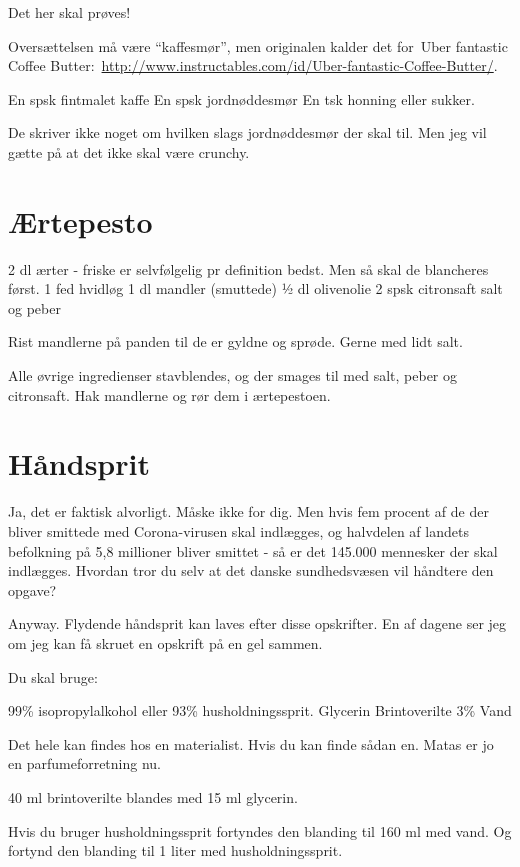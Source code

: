 \documentclass[
]{book}
\begin{document}
Det her skal prøves!~

Oversættelsen må være ``kaffesmør'', men originalen kalder det for~Uber fantastic Coffee Butter:~\url{http://www.instructables.com/id/Uber-fantastic-Coffee-Butter/}.

En spsk fintmalet kaffe
En spsk jordnøddesmør
En tsk honning eller sukker.

De skriver ikke noget om hvilken slags jordnøddesmør der skal til. Men jeg vil gætte på at det ikke skal være crunchy.

\section{Ærtepesto}\label{uxe6rtepesto}

2 dl ærter - friske er selvfølgelig pr definition bedst. Men så skal de blancheres først.
1 fed hvidløg
1 dl mandler (smuttede)
½ dl olivenolie
2 spsk citronsaft
salt og peber

Rist mandlerne på panden til de er gyldne og sprøde. Gerne med lidt salt.

Alle øvrige ingredienser stavblendes, og der smages til med salt, peber og citronsaft. Hak mandlerne og rør dem i ærtepestoen.

\section{Håndsprit}\label{huxe5ndsprit}

Ja, det er faktisk alvorligt. Måske ikke for dig. Men hvis fem procent af de der bliver smittede med Corona-virusen skal indlægges, og halvdelen af landets befolkning på 5,8 millioner bliver smittet - så er det 145.000 mennesker der skal indlægges. Hvordan tror du selv at det danske sundhedsvæsen vil håndtere den opgave?

Anyway. Flydende håndsprit kan laves efter disse opskrifter. En af dagene ser jeg om jeg kan få skruet en opskrift på en gel sammen.

Du skal bruge:

99\% isopropylalkohol eller 93\% husholdningssprit.
Glycerin
Brintoverilte 3\%
Vand

Det hele kan findes hos en materialist. Hvis du kan finde sådan en. Matas er jo en parfumeforretning nu.

40 ml brintoverilte blandes med 15 ml glycerin.

Hvis du bruger husholdningssprit fortyndes den blanding til 160 ml med vand. Og fortynd den blanding til 1 liter med husholdningssprit.
\end{document}
